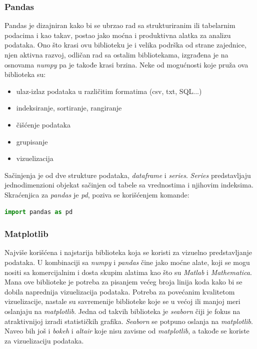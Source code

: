 \documentclass[12pt]{article}
\begin{document}
\subsubsection{Pandas}
Pandas je dizajniran kako bi se ubrzao rad sa strukturiranim ili tabelarnim podacima i kao takav, postao jako moćna i produktivna alatka za analizu podataka. Ono što krasi ovu biblioteku je i velika podrška od strane zajednice, njen aktivna razvoj, odličan rad sa ostalim bibliotekama, izgrađena je na osnovama \textsl{numpy} pa je takođe krasi brzina. Neke od mogućnosti koje pruža ova biblioteka su:
\begin{itemize}
  \item ulaz-izlaz podataka u različitim formatima (csv, txt, SQL...)
  \item indeksiranje, sortiranje, rangiranje
  \item čišćenje podataka 
  \item grupisanje
  \item vizuelizacija
\end{itemize}
Sačinjenja je od dve strukture podataka, \textsl{dataframe} i \textsl{series}. \textsl{Series} predstavljaju jednodimenzioni objekat sačinjen od tabele sa vrednostima i njihovim indeksima. Skraćenjica za \textsl{pandas} je \textsl{pd}, poziva se korišćenjem komande:
\begin{lstlisting}[language=Python]
 import pandas as pd 
\end{lstlisting}
\subsubsection{Matplotlib}
Najviše korišćena i najstarija biblioteka koja se koristi za vizuelno predstavljanje podataka. U kombinaciji sa \textsl{numpy} i \textsl{pandas} čine jako moćne alate, koji se mogu nositi sa komercijalnim i dosta skupim alatima kao što su \textsl{Matlab} i \textsl{Mathematica}. Mana ove biblioteke je potreba za pisanjem većeg broja linija koda kako bi se dobila naprednija vizuelizacija podataka. 
Potreba za povećanim kvalitetom vizuelizacije, nastale su savremenije biblioteke koje se u većoj ili manjoj meri oslanjaju na \textsl{matplotlib}. Jedna od takvih biblioteka je \textsl{seaborn} čiji je fokus na  atraktivnijoj izradi statističkih grafika.  \textsl{Seaborn} se potpuno oslanja na \textsl{matplotlib}.  Naveo bih još i \textsl{bokeh} i \textsl{altair} koje nisu zavisne od \textsl{matplotlib}, a takođe se koriste za vizuelizaciju podataka.
\end{document}
